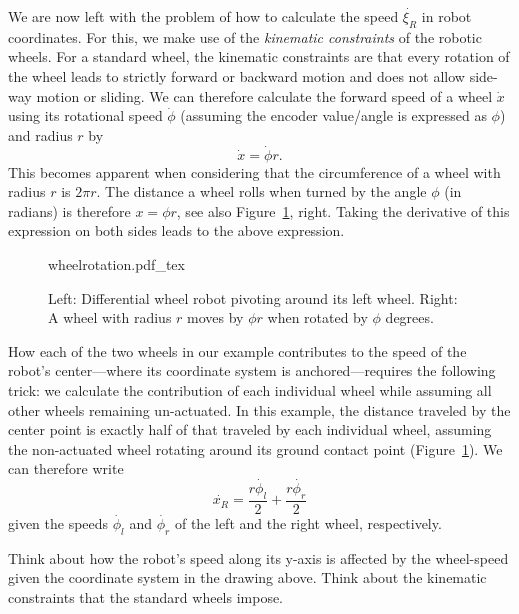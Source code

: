 We are now left with the problem of how to calculate the speed $ \dot{\xi_R}$ in robot coordinates. For this, we make use of the \emph{kinematic constraints} of the robotic wheels. For a standard wheel, the kinematic constraints are that every rotation of the wheel leads to strictly forward or backward motion and does not allow side-way motion or sliding. We can therefore calculate the forward speed of a wheel $ \dot{x}$ using its rotational speed $ \dot{\phi}$ (assuming the encoder value/angle is expressed as $ \phi$) and radius $ r$ by
\begin{equation}
\dot{x}=\dot{\phi}r.
\end{equation}
This becomes apparent when considering that the circumference of a wheel with radius $r$ is $2\pi r$. The distance a wheel rolls when turned by the angle $ \phi$ (in radians) is therefore $ x=\phi r$, see also Figure~\ref{fig:wheelrotation}, right. Taking the derivative of this expression on both sides leads to the above expression.

\begin{figure}[htb!]
    \centering
    \def\svgwidth{0.86\textwidth}
    {wheelrotation.pdf_tex}
    \caption{Left: Differential wheel robot pivoting around its left wheel. Right: A wheel with radius $r$ moves by $\phi r$ when rotated by $\phi$ degrees.}
    \label{fig:wheelrotation}
\end{figure}



How each of the two wheels in our example contributes to the speed of the robot's center---where its coordinate system is anchored---requires the following trick: we calculate the contribution of each individual wheel while assuming all other wheels remaining un-actuated. In this example, the distance traveled by the center point is exactly half of that traveled by each individual wheel, assuming the non-actuated wheel rotating around its ground contact point (Figure~\ref{fig:wheelrotation}). We can therefore write
\begin{equation}
\dot{x_R}=\frac{r\dot{\phi_l}}{2}+\frac{r\dot{\phi_r}}{2}
\end{equation}
given the speeds $ \dot{\phi_l}$ and $ \dot{\phi_r}$ of the left and the right wheel, respectively.

\begin{framed}
Think about how the robot's speed along its y-axis is affected by the wheel-speed given the coordinate system in the drawing above. Think about the kinematic constraints that the standard wheels impose.
\end{framed}

